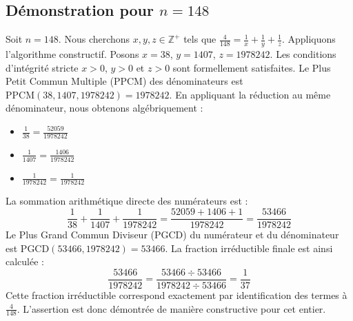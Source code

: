 \documentclass[11pt,a4paper]{article}
\begin{document}
\subsection{Démonstration pour $n = 148$}
Soit $n = 148$. Nous cherchons $x, y, z \in \mathbb{Z}^{+}$ tels que $\frac{4}{148} = \frac{1}{x} + \frac{1}{y} + \frac{1}{z}$.
Appliquons l'algorithme constructif. Posons $x = 38$, $y = 1407$, $z = 1978242$.
Les conditions d'intégrité stricte $x > 0$, $y > 0$ et $z > 0$ sont formellement satisfaites.
Le Plus Petit Commun Multiple (PPCM) des dénominateurs est $\text{PPCM}(38, 1407, 1978242) = 1978242$.
En appliquant la réduction au même dénominateur, nous obtenons algébriquement :
\begin{itemize}
    \item $\frac{1}{38} = \frac{52059}{1978242}$
    \item $\frac{1}{1407} = \frac{1406}{1978242}$
    \item $\frac{1}{1978242} = \frac{1}{1978242}$
\end{itemize}
La sommation arithmétique directe des numérateurs est :
$$ \frac{1}{38} + \frac{1}{1407} + \frac{1}{1978242} = \frac{52059 + 1406 + 1}{1978242} = \frac{53466}{1978242} $$
Le Plus Grand Commun Diviseur (PGCD) du numérateur et du dénominateur est $\text{PGCD}(53466, 1978242) = 53466$.
La fraction irréductible finale est ainsi calculée :
$$ \frac{53466}{1978242} = \frac{53466 \div 53466}{1978242 \div 53466} = \frac{1}{37} $$
Cette fraction irréductible correspond exactement par identification des termes à $\frac{4}{148}$. L'assertion est donc démontrée de manière constructive pour cet entier.
\end{document}
